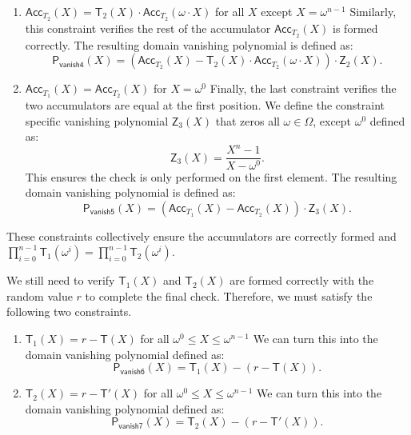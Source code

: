 \begin{enumerate}
\begin{equation}
    \end{equation}
    \item $\mathsf{Acc}_{T_2}(X) = \mathsf{T}_2(X)\cdot \mathsf{Acc}_{T_2}(\omega\cdot X)$ for all $X$ except $X=\omega^{n-1}$
    \newline Similarly, this constraint verifies the rest of the accumulator $\mathsf{Acc}_{T_2}(X)$ is formed correctly. The resulting domain vanishing polynomial is defined as:
    \begin{equation}
      \label{eq:v4}
    \mathsf{P}_\mathsf{vanish4}(X) = (\mathsf{Acc}_{T_2}(X) - \mathsf{T}_2(X)\cdot \mathsf{Acc}_{T_2}(\omega\cdot X))\cdot \mathsf{Z}_2(X).
    \end{equation}
    \item $\mathsf{Acc}_{T_1}(X) =\mathsf{Acc}_{T_2}(X)$ for $X=\omega^0$
    \newline Finally, the last constraint verifies the two accumulators are equal at the first position. We define the constraint specific vanishing polynomial $\mathsf{Z}_3(X)$ that zeros all $\omega\in\Omega$, except $\omega^{0}$ defined as:
     \begin{equation}
      \label{eq:zv3}
    \mathsf{Z}_3(X) = \frac{X^n-1}{X-\omega^0}.
    \end{equation}
    This ensures the check is only performed on the first element. The resulting domain vanishing polynomial is defined as: 
    \begin{equation}
      \label{eq:v5}
  \mathsf{P}_\mathsf{vanish5}(X) = (\mathsf{Acc}_{T_1}(X) - \mathsf{Acc}_{T_2}(X))\cdot \mathsf{Z}_3(X).   
  \end{equation}
  \end{enumerate}
These constraints collectively ensure the accumulators are correctly formed and $\prod^{n-1}_{i=0} \mathsf{T}_1(\omega^i) = \prod^{n-1}_{i=0} \mathsf{T}_2(\omega^i)$.


We still need to verify $\mathsf{T}_1(X)$ and $\mathsf{T}_2(X)$ are formed correctly with the random value $r$ to complete the final check. 
Therefore, we must satisfy the following two constraints.
\begin{enumerate}
\item $\mathsf{T}_1(X)=r-\mathsf{T}(X)$ for all $\omega^0 \le X \le \omega^{n-1}$
\newline We can turn this into the domain vanishing polynomial defined as:
\begin{equation}
\label{eq:v6}
\mathsf{P}_\mathsf{vanish6}(X) = \mathsf{T}_1(X) - (r-\mathsf{T}(X)).
\end{equation}
\item $\mathsf{T}_2(X)=r-\mathsf{T}'(X)$ for all $\omega^0 \le X \le \omega^{n-1}$
\newline We can turn this into the domain vanishing polynomial defined as:
\begin{equation}
\label{eq:v7}
\mathsf{P}_\mathsf{vanish7}(X) = \mathsf{T}_2(X) - (r-\mathsf{T}'(X)).
\end{equation}
\end{enumerate}

